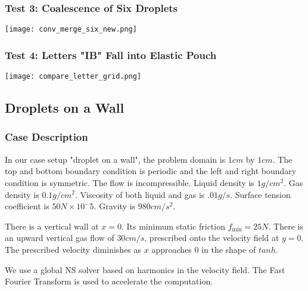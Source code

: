 \documentclass{jfm}
\begin{document}
    \subsubsection {Test 3: Coalescence of Six Droplets}
        {\centering
            \texttt{[image: conv\_merge\_six\_new.png]} 
            \par
        }
    \subsubsection {Test 4: Letters "IB" Fall into Elastic Pouch}
        {\centering
            \texttt{[image: compare\_letter\_grid.png]} 
            \par
        }
\subsection {Droplets on a Wall}
    \subsubsection {Case Description}
        In our case setup "droplet on a wall", the problem domain is $1cm$ by $1cm$. The top and bottom boundary condition is periodic and the left and right boundary condition is symmetric. The flow is incompressible. Liquid density is $1 g/cm^2$. Gas density is $0.1 g/cm^2$. Viscosity of both liquid and gas is $.01 g/s$. Surface tension coefficient is $50 N\times10^-5$. Gravity is $980 cm/s^2$. 
        
        There is a vertical wall at $x=0$. Its minimum static friction $f_\text{min}=25 N$. There is an upward vertical gas flow of $30 cm/s$, prescribed onto the velocity field at $y=0$. The prescribed velocity diminishes as $x$ approaches $0$ in the shape of $tanh$. 
        
        We use a global NS solver based on harmonics in the velocity field. The Fast Fourier Transform is used to accelerate the computation. 
        
\end{document}
